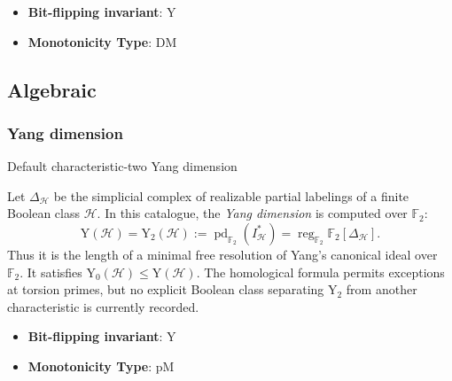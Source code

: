       \begin{definition}\label{def:maximum_largest_order_shattered_set}
      
      \end{definition}
      \begin{itemize}
      \item {\bf Bit-flipping invariant}: Y
      \item {\bf Monotonicity Type}: DM
      \end{itemize}
\subsection{Algebraic}\label{sec:Algebraic}
\subsubsection{Yang dimension}
      Default characteristic-two Yang dimension
      \begin{definition}\label{def:yang_dimension}
      Let $\Delta_{\mathcal H}$ be the simplicial complex of realizable partial labelings of a finite Boolean class $\mathcal H$.  In this catalogue, the \emph{Yang dimension} is computed over $\mathbb F_2$:
      \[
      \mathrm Y(\mathcal H)=\mathrm Y_2(\mathcal H)
      :=\operatorname{pd}_{\mathbb F_2}(I^*_{\mathcal H})
      =\operatorname{reg}_{\mathbb F_2}\mathbb F_2[\Delta_{\mathcal H}].
      \]
      Thus it is the length of a minimal free resolution of Yang's canonical ideal over $\mathbb F_2$.  It satisfies $\mathrm Y_0(\mathcal H)\leq\mathrm Y(\mathcal H)$.  The homological formula permits exceptions at torsion primes, but no explicit Boolean class separating $\mathrm Y_2$ from another characteristic is currently recorded.
      \end{definition}
      \begin{itemize}
      \item {\bf Bit-flipping invariant}: Y
      \item {\bf Monotonicity Type}: pM
      \end{itemize}
